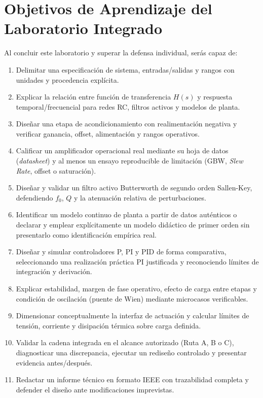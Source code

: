 \documentclass[11pt, a4paper]{article}
\begin{document}
\section*{Objetivos de Aprendizaje del Laboratorio Integrado}
Al concluir este laboratorio y superar la defensa individual, serás capaz de:
\begin{enumerate}[noitemsep, leftmargin=*]
    \item Delimitar una especificación de sistema, entradas/salidas y rangos con unidades y procedencia explícita.
    \item Explicar la relación entre función de transferencia $H(s)$ y respuesta temporal/frecuencial para redes RC, filtros activos y modelos de planta.
    \item Diseñar una etapa de acondicionamiento con realimentación negativa y verificar ganancia, offset, alimentación y rangos operativos.
    \item Calificar un amplificador operacional real mediante su hoja de datos (\textit{datasheet}) y al menos un ensayo reproducible de limitación (GBW, \textit{Slew Rate}, offset o saturación).
    \item Diseñar y validar un filtro activo Butterworth de segundo orden Sallen-Key, defendiendo $f_0$, $Q$ y la atenuación relativa de perturbaciones.
    \item Identificar un modelo continuo de planta a partir de datos auténticos o declarar y emplear explícitamente un modelo didáctico de primer orden sin presentarlo como identificación empírica real.
    \item Diseñar y simular controladores P, PI y PID de forma comparativa, seleccionando una realización práctica PI justificada y reconociendo límites de integración y derivación.
    \item Explicar estabilidad, margen de fase operativo, efecto de carga entre etapas y condición de oscilación (puente de Wien) mediante microcasos verificables.
    \item Dimensionar conceptualmente la interfaz de actuación y calcular límites de tensión, corriente y disipación térmica sobre carga definida.
    \item Validar la cadena integrada en el alcance autorizado (Ruta A, B o C), diagnosticar una discrepancia, ejecutar un rediseño controlado y presentar evidencia antes/después.
    \item Redactar un informe técnico en formato IEEE con trazabilidad completa y defender el diseño ante modificaciones imprevistas.
\end{enumerate}
\end{document}
